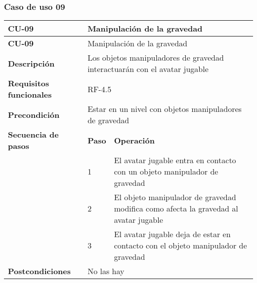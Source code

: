\subsubsection{Caso de uso 09}
\begin{longtable}{lll}
\textbf{CU-09}                                   & \multicolumn{2}{l}{Manipulación de la gravedad}                                                                                                              \\ \hline
\endfirsthead
\textbf{CU-09}                                   & \multicolumn{2}{l}{Manipulación de la gravedad}                                                                                                              \\ \hline
\endhead
%
\textbf{Descripción}                             & \multicolumn{2}{l}{Los objetos manipuladores de gravedad interactuarán con el avatar jugable}                                                                \\ \hline
\textbf{Requisitos funcionales}                  & \multicolumn{2}{l}{RF-4.5}                                                                                                                                   \\ \hline
\textbf{Precondición}                            & \multicolumn{2}{l}{Estar en un nivel con objetos manipuladores de gravedad}                                                                                  \\ \hline
\multicolumn{1}{l|}{\textbf{Secuencia de pasos}} & \textbf{Paso}                             & \textbf{Operación}                                                                                               \\ \cline{2-3} 
\multicolumn{1}{l|}{}                            & 1                                         & El avatar jugable entra en contacto con un objeto manipulador de gravedad                                        \\
\multicolumn{1}{l|}{}                            & 2                                         & El objeto manipulador de gravedad modifica como afecta la gravedad al avatar jugable                             \\
\multicolumn{1}{l|}{}                            & 3                                         & El avatar jugable deja de estar en contacto con el objeto manipulador de gravedad                                \\ \hline
\textbf{Postcondiciones}                         & \multicolumn{2}{l}{No las hay}                                                                                                                               \\ \hline

\end{longtable}
